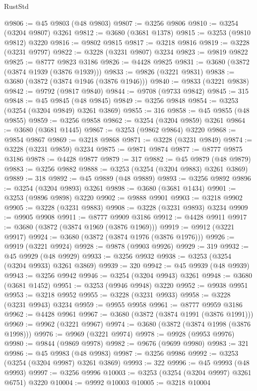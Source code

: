\begin{lexlean}{RustStd}
\begin{coremodule}
{\begin{coremodule}
{{{{{{{{{{{{{{{{{{{{{{{{{{{{{{{{{{{{{@9806 := @45 @9803 (@48 @9803)
@9807 := @3256 @9806
@9810 := @3254 (@3204 @9807) @3261
@9812 := @3680 (@3681 @1378)
@9815 := @3253 (@9810 @9812) @3220
@9816 := @9802 @9815
@9817 := @3218 @9816
@9819 := @3228 (@3231 @9797)
@9822 := @3228 (@3231 @9807) @3234
@9823 := @9819 @9822
@9825 := @8777 @9823 @3186
@9826 := @4428 @9825
@9831 := @3680 (@3872 (@3874 @1939 (@3876 @1939)))
@9833 := @9826 (@3221 @9831)
@9838 := @3680 (@3872 (@3874 @1946 (@3876 @1946)))
@9840 := @9833 (@3221 @9838)
@9842 := @9792 (@9817 @9840)
@9844 := @9708 (@9733 @9842)
@9845 := 315
@9848 := @45 @9845 (@48 @9845)
@9849 := @3256 @9848
@9854 := @3253 (@3254 (@3204 @9849) @3261 @3869)
@9855 := 316
@9858 := @45 @9855 (@48 @9855)
@9859 := @3256 @9858
@9862 := @3254 (@3204 @9859) @3261
@9864 := @3680 (@3681 @1445)
@9867 := @3253 (@9862 @9864) @3220
@9868 := @9854 @9867
@9869 := @3218 @9868
@9871 := @3228 (@3231 @9849)
@9874 := @3228 (@3231 @9859) @3234
@9875 := @9871 @9874
@9877 := @8777 @9875 @3186
@9878 := @4428 @9877
@9879 := 317
@9882 := @45 @9879 (@48 @9879)
@9883 := @3256 @9882
@9888 := @3253 (@3254 (@3204 @9883) @3261 @3869)
@9889 := 318
@9892 := @45 @9889 (@48 @9889)
@9893 := @3256 @9892
@9896 := @3254 (@3204 @9893) @3261
@9898 := @3680 (@3681 @1434)
@9901 := @3253 (@9896 @9898) @3220
@9902 := @9888 @9901
@9903 := @3218 @9902
@9905 := @3228 (@3231 @9883)
@9908 := @3228 (@3231 @9893) @3234
@9909 := @9905 @9908
@9911 := @8777 @9909 @3186
@9912 := @4428 @9911
@9917 := @3680 (@3872 (@3874 @1969 (@3876 @1969)))
@9919 := @9912 (@3221 @9917)
@9924 := @3680 (@3872 (@3874 @1976 (@3876 @1976)))
@9926 := @9919 (@3221 @9924)
@9928 := @9878 (@9903 @9926)
@9929 := 319
@9932 := @45 @9929 (@48 @9929)
@9933 := @3256 @9932
@9938 := @3253 (@3254 (@3204 @9933) @3261 @3869)
@9939 := 320
@9942 := @45 @9939 (@48 @9939)
@9943 := @3256 @9942
@9946 := @3254 (@3204 @9943) @3261
@9948 := @3680 (@3681 @1452)
@9951 := @3253 (@9946 @9948) @3220
@9952 := @9938 @9951
@9953 := @3218 @9952
@9955 := @3228 (@3231 @9933)
@9958 := @3228 (@3231 @9943) @3234
@9959 := @9955 @9958
@9961 := @8777 @9959 @3186
@9962 := @4428 @9961
@9967 := @3680 (@3872 (@3874 @1991 (@3876 @1991)))
@9969 := @9962 (@3221 @9967)
@9974 := @3680 (@3872 (@3874 @1998 (@3876 @1998)))
@9976 := @9969 (@3221 @9974)
@9978 := @9928 (@9953 @9976)
@9980 := @9844 (@9869 @9978)
@9982 := @9676 (@9699 @9980)
@9983 := 321
@9986 := @45 @9983 (@48 @9983)
@9987 := @3256 @9986
@9992 := @3253 (@3254 (@3204 @9987) @3261 @3869)
@9993 := 322
@9996 := @45 @9993 (@48 @9993)
@9997 := @3256 @9996
@10003 := @3253 (@3254 (@3204 @9997) @3261 @6751) @3220
@10004 := @9992 @10003
@10005 := @3218 @10004
}}}}}}}}}}}}}}}}}}}}}}}}}}}}}}}}}}}}}
\end{coremodule}}
\end{coremodule}
\end{lexlean}

